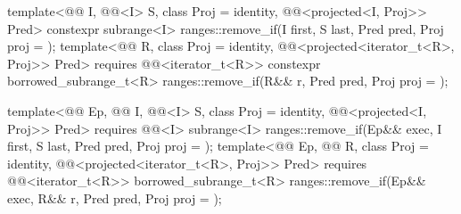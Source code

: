 \begin{itemdecl}
template<@@ I, @@<I> S, class Proj = identity,
         @@<projected<I, Proj>> Pred>
  constexpr subrange<I> ranges::remove_if(I first, S last, Pred pred, Proj proj = {});
template<@@ R, class Proj = identity,
         @@<projected<iterator_t<R>, Proj>> Pred>
  requires @@<iterator_t<R>>
  constexpr borrowed_subrange_t<R>
    ranges::remove_if(R&& r, Pred pred, Proj proj = {});

template<@@ Ep, @@ I, @@<I> S,
         class Proj = identity, @@<projected<I, Proj>> Pred>
  requires @@<I>
  subrange<I>
    ranges::remove_if(Ep&& exec, I first, S last, Pred pred, Proj proj = {});
template<@@ Ep, @@ R, class Proj = identity,
         @@<projected<iterator_t<R>, Proj>> Pred>
  requires @@<iterator_t<R>>
  borrowed_subrange_t<R>
    ranges::remove_if(Ep&& exec, R&& r, Pred pred, Proj proj = {});
\end{itemdecl}

